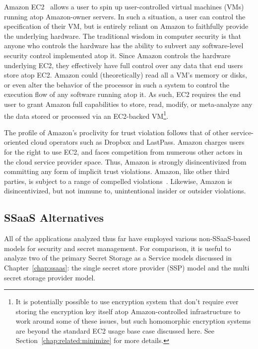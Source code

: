 Amazon EC2~\cite{amazon-ec2} allows a user to spin up user-controlled
virtual machines (VMs) running atop Amazon-owner servers. In such a
situation, a user can control the specification of their VM, but is
entirely reliant on Amazon to faithfully provide the underlying
hardware. The traditional wisdom in computer security is that anyone
who controls the hardware has the ability to subvert any
software-level security control implemented atop it. Since Amazon
controls the hardware underlying EC2, they effectively have full
control over any data that end users store atop EC2. Amazon could
(theoretically) read all a VM's memory or disks, or even alter the
behavior of the processor in such a system to control the execution
flow of any software running atop it. As such, EC2 requires the end
user to grant Amazon full capabilities to store, read, modify, or
meta-analyze any the data stored or processed via an EC2-backed
VM\footnote{It is potentially possible to use encryption system that
  don't require ever storing the encryption key itself atop
  Amazon-controlled infrastructure to work around some of these
  issues, but such homomorphic encryption systems are beyond the
  standard EC2 usage base case discussed here. See
  Section~\ref{chap:related:minimize} for more details.}.

The profile of Amazon's proclivity for trust violation follows that of
other service-oriented cloud operators such as Dropbox and
LastPass. Amazon charges users for the right to use EC2, and faces
competition from numerous other actors in the cloud service provider
space. Thus, Amazon is strongly disincentivized from committing any
form of implicit trust violations. Amazon, like other third parties,
is subject to a range of compelled
violations~\cite{amazon-transparency}. Likewise, Amazon is
disincentivized, but not immune to, unintentional insider or outsider
violations.

\subsection{SSaaS Alternatives}

All of the applications analyzed thus far have employed various
non-SSaaS-based models for security and secret management. For
comparison, it is useful to analyze two of the primary Secret Storage
as a Service models discussed in Chapter~\ref{chap:ssaas}: the single
secret store provider (SSP) model and the multi secret storage
provider model.

